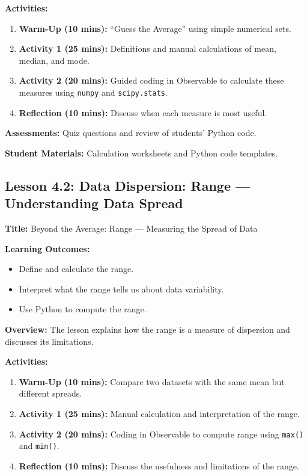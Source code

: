 \documentclass{tufte-book}
\begin{document}
\medskip
\textbf{Activities:}
\begin{enumerate}[label=\arabic*.]
    \item \textbf{Warm-Up (10 mins):} “Guess the Average” using simple numerical sets.
    \item \textbf{Activity 1 (25 mins):} Definitions and manual calculations of mean, median, and mode.
    \item \textbf{Activity 2 (20 mins):} Guided coding in Observable to calculate these measures using \texttt{numpy} and \texttt{scipy.stats}.
    \item \textbf{Reflection (10 mins):} Discuss when each measure is most useful.
\end{enumerate}

\medskip
\textbf{Assessments:}  
Quiz questions and review of students’ Python code.

\medskip
\textbf{Student Materials:}  
Calculation worksheets and Python code templates.

\subsection{Lesson 4.2: Data Dispersion: Range --- Understanding Data Spread}
\textbf{Title:} Beyond the Average: Range --- Measuring the Spread of Data

\medskip
\textbf{Learning Outcomes:}
\begin{itemize}[leftmargin=*, label={\textbullet}]
    \item Define and calculate the range.
    \item Interpret what the range tells us about data variability.
    \item Use Python to compute the range.
\end{itemize}

\medskip
\textbf{Overview:}  
The lesson explains how the range is a measure of dispersion and discusses its limitations.

\medskip
\textbf{Activities:}
\begin{enumerate}[label=\arabic*.]
    \item \textbf{Warm-Up (10 mins):} Compare two datasets with the same mean but different spreads.
    \item \textbf{Activity 1 (25 mins):} Manual calculation and interpretation of the range.
    \item \textbf{Activity 2 (20 mins):} Coding in Observable to compute range using \texttt{max()} and \texttt{min()}.
    \item \textbf{Reflection (10 mins):} Discuss the usefulness and limitations of the range.
\end{enumerate}
\end{document}
